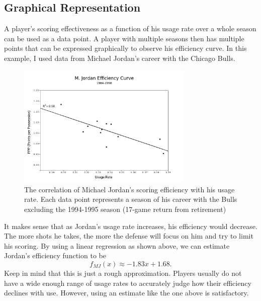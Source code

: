 \documentclass{article}
\begin{document}
\subsection*{Graphical Representation}
A player's scoring effectiveness as a function of his usage rate over a whole season can be used as a data point. A player with multiple seasons then has multiple points that can be expressed graphically to observe his efficiency curve. In this example, I used data from Michael Jordan's career with the Chicago Bulls.
\begin{figure}[H]
\centering
\includegraphics[width=0.75\textwidth]{jordancurve.png}
\caption{The correlation of Michael Jordan's scoring efficiency with his usage rate. Each data point represents a season of his career with the Bulls excluding the 1994-1995 season (17-game return from retirement)}
\end{figure}
It makes sense that as Jordan's usage rate increases, his efficiency would decrease. The more shots he takes, the more the defense will focus on him and try to limit his scoring. By using a linear regression as shown above, we can estimate Jordan's efficiency function to be $$f_{MJ}(x) \approx -1.83x+1.68.$$
Keep in mind that this is just a rough approximation. Players usually do not have a wide enough range of usage rates to accurately judge how their efficiency declines with use. However, using an estimate like the one above is satisfactory.
\end{document}
